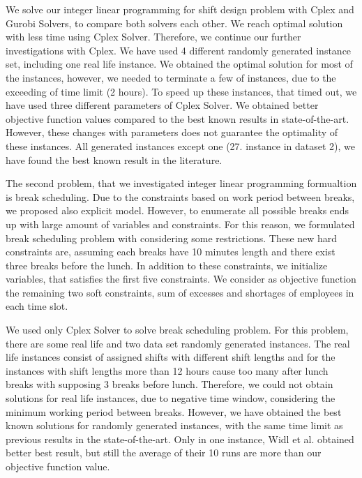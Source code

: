 We solve our integer linear programming for shift design problem with Cplex and Gurobi Solvers, to compare both solvers each other. We reach optimal solution with less time using Cplex Solver. Therefore, we continue our further investigations with Cplex. We have used 4 different randomly generated instance set, including one real life instance. We obtained the optimal solution for most of the instances, however, we needed to terminate a few of instances, due to the exceeding of time limit (2 hours). To speed up these instances, that timed out, we have used three different parameters of Cplex Solver. We obtained better objective function values compared to the best known results in state-of-the-art. However, these changes with parameters does not guarantee the optimality 
of these instances. All generated instances except one (27. instance in dataset 2), we have found the best known result in the literature.  

The second problem, that we investigated integer linear programming formualtion is break scheduling. Due to the constraints based on work period between breaks, we proposed also explicit model. However, to enumerate all possible breaks ends up with large amount of variables and constraints. For this reason, we formulated break scheduling problem with considering some restrictions. These new hard constraints are, assuming each breaks have 10 minutes length and there exist three breaks before the lunch. In addition to these constraints, we initialize variables, that satisfies the first five constraints. We consider as objective function the remaining two soft constraints, sum of excesses and shortages of employees in each time slot.

We used only Cplex Solver to solve break scheduling problem. For this problem, there are some real life and two data set randomly generated instances. The real life instances consist of assigned shifts with different shift lengths and for the instances with shift lengths more than 12 hours cause too many after lunch breaks with supposing 3 breaks before lunch. Therefore, we could not obtain solutions for real life instances, due to negative time window, considering the minimum working period between breaks. However, we have obtained the best known solutions for randomly generated instances, with the same time limit as previous results in the state-of-the-art. Only in one instance, Widl et al. obtained better best result, but still the average of their 10 runs are more than our objective function value.

